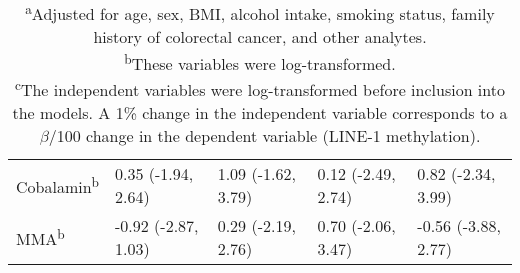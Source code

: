 \begin{sidewaystable}
\begin{adjustbox}{width=18cm}
\begin{tabular}{L{3cm}C{4.0cm}C{4.0cm}C{4.0cm}C{4.0cm}}
Cobalamin\textsuperscript{b} & 0.35 (-1.94, 2.64) & 1.09 (-1.62, 3.79) & 0.12 (-2.49, 2.74) &  0.82 (-2.34, 3.99)\\

MMA\textsuperscript{b} & -0.92 (-2.87, 1.03) & 0.29 (-2.19, 2.76) & 0.70 (-2.06, 3.47) & -0.56 (-3.88, 2.77)\\
\hline
\end{tabular}
\end{adjustbox}
\caption*{\footnotesize{\textsuperscript{a}Adjusted for age, sex, BMI, alcohol intake, smoking status, family history of colorectal cancer, and other analytes. \\ \textsuperscript{b}These variables were log-transformed. \\ \textsuperscript{c}The independent variables were log-transformed before inclusion into the models. A 1\% change in the independent variable corresponds to a $\beta$/100 change in the dependent variable (LINE-1 methylation).}}
\end{sidewaystable}

